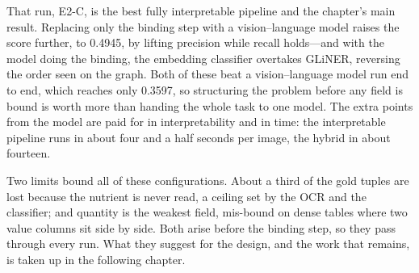 That run, E2-C, is the best fully interpretable pipeline and the chapter's
main result. Replacing only the binding step with a vision--language model
raises the score further, to 0.4945, by lifting precision while recall
holds---and with the model doing the binding, the embedding classifier
overtakes GLiNER, reversing the order seen on the graph. Both of these beat
a vision--language model run end to end, which reaches only 0.3597, so
structuring the problem before any field is bound is worth more than handing
the whole task to one model. The extra points from the model are paid for in
interpretability and in time: the interpretable pipeline runs in about four
and a half seconds per image, the hybrid in about fourteen.

Two limits bound all of these configurations. About a third of the gold
tuples are lost because the nutrient is never read, a ceiling set by the OCR
and the classifier; and quantity is the weakest field, mis-bound on dense
tables where two value columns sit side by side. Both arise before the
binding step, so they pass through every run. What they suggest for the
design, and the work that remains, is taken up in the following chapter.